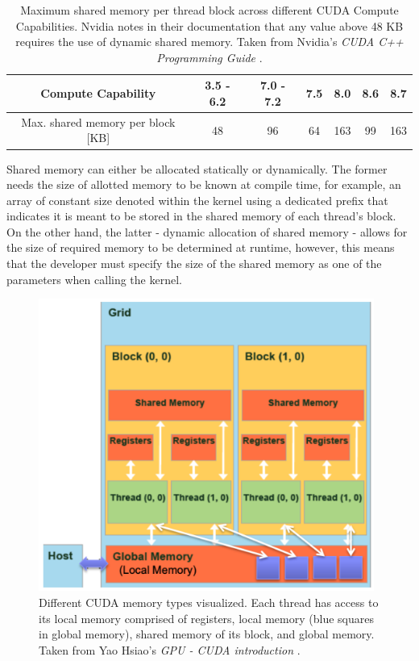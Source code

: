 \begin{table}[h!]
	\centering
	\renewcommand{\arraystretch}{1.5}
	\begin{tabular}{ |c|c|c|c|c|c|c| } 
		\hline
		Compute Capability & 3.5 - 6.2 & 7.0 - 7.2 & 7.5 & 8.0 & 8.6 & 8.7 \\
		\hline
		Max. shared memory per block [KB] & 48 & 96 & 64 & 163 & 99 & 163 \\
		\hline
	\end{tabular}
	\caption{Maximum shared memory per thread block across different CUDA Compute Capabilities. Nvidia notes in their documentation that any value above 48 KB requires the use of dynamic shared memory. Taken from Nvidia's \emph{CUDA C++ Programming Guide} \cite{NVIDIAMay2022}.}
	\label{Table:CUDA-block-max-shared-memory}
\end{table}

Shared memory can either be allocated statically or dynamically. The former needs the size of allotted memory to be known at compile time, for example, an array of constant size denoted within the kernel using a dedicated prefix that indicates it is meant to be stored in the shared memory of each thread's block. On the other hand, the latter - dynamic allocation of shared memory - allows for the size of required memory to be determined at runtime, however, this means that the developer must specify the size of the shared memory as one of the parameters when calling the kernel. \\

\begin{figure}[h!]
	\centering
	\includegraphics[width=11cm, keepaspectratio]{images/ch1/CUDA_memory_types_detailed.png}
	\caption{Different CUDA memory types visualized. Each thread has access to its local memory comprised of registers, local memory (blue squares in global memory), shared memory of its block, and global memory. Taken from Yao Hsiao's \emph{GPU - CUDA introduction} \cite{Hsiao17December2019}.}
	\label{Figure:CUDA-memory-types-detailed}
\end{figure}

